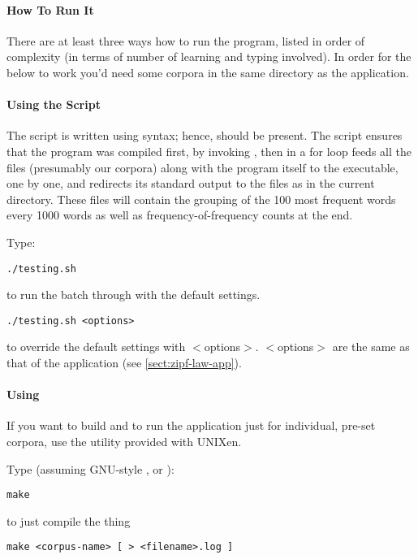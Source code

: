 \paragraph{How To Run It}

There are at least three ways how to run the program, listed in order of complexity
(in terms of number of learning and typing involved).
In order for the below to work you'd need some corpora in
the same directory as the application.

\paragraph{Using the  Script}

The script is written using  syntax; hence,  should be
present. The script ensures
that the program was compiled first, by invoking , then
in a for loop feeds all the  files (presumably our corpora) along with the 
program itself to the executable, one by one, and redirects its standard output
to the files as  in the current directory. These files will contain the
grouping of the 100 most frequent words every 1000 words as well as frequency-of-frequency counts at the end.

\noindent
Type:

\verb+./testing.sh+

\noindent
to run the batch through with the default settings.

\verb+./testing.sh <options>+

\noindent
to override the default settings with $<$options$>$. $<$options$>$ are the same
as that of the  application (see \ref{sect:zipf-law-app}).

\paragraph{Using }

If you want to build and to run the application just for individual,
pre-set corpora, use the  utility provided with UNIXen.

Type (assuming GNU-style , or ):

\noindent
\verb+make+

	to just compile the thing

\noindent
\verb+make <corpus-name> [ > <filename>.log ]+


